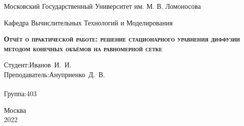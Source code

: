 \documentclass[a4paper, 11pt]{article}
\begin{document}
\begin{titlepage}
	\newpage
	
	\begin{center}
		Московский Государственный Университет им. М. В. Ломоносова \\
	\end{center}
	
	\vspace{8em}
	
	\begin{center}
		\Large Кафедра Вычислительных Технологий и Моделирования \\ 
	\end{center}
	
	\vspace{2em}
	
	\begin{center}
		\textsc{\textbf{Отчёт о практической работе: \linebreak решение стационарного уравнения диффузии \linebreak методом конечных объёмов \linebreak на равномерной сетке}}
	\end{center}
	
	\vspace{6em}
	
	
	
	\newbox{\lbox}
	\savebox{\lbox}{\hbox{}}
	\newlength{\maxl}
	\setlength{\maxl}{\wd\lbox}
	\hfill\parbox{11cm}{
		\hspace*{5cm}\hspace*{-5cm}Студент:\hfill\hbox {Иванов И. И.\hfill}\\
		\hspace*{5cm}\hspace*{-5cm}Преподаватель:\hfill\hbox {Ануприенко Д. В.\hfill}\\
		\\
		\hspace*{5cm}\hspace*{-5cm}Группа:\hfill\hbox {403}\\
	}
	
	
	\vspace{\fill}
	
	\begin{center}
		Москва \\ 2022
	\end{center}
	
\end{titlepage}

\setcounter{MaxMatrixCols}{20}
\end{document}
